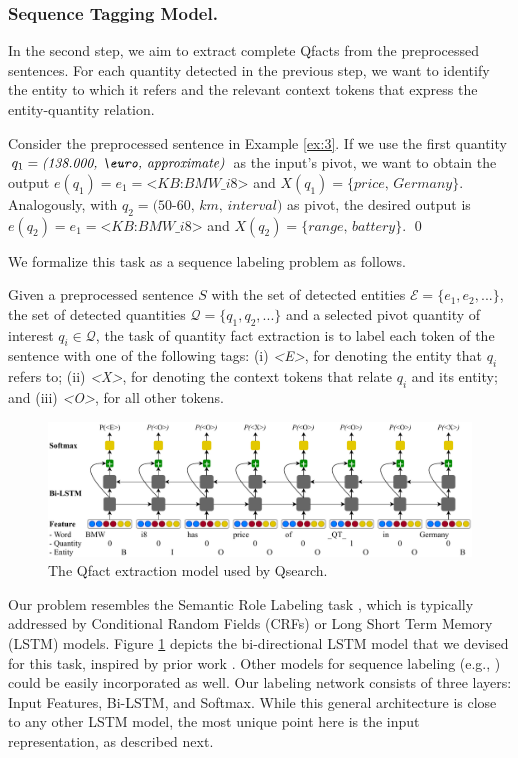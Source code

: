 \subsubsection{Sequence Tagging Model.} In the second step, we aim to extract complete Qfacts from the preprocessed sentences. 
For each quantity detected in the previous step, we want to identify the entity to which it refers
and the relevant context tokens that express the entity-quantity relation.
\begin{example} 
Consider the preprocessed sentence in Example \ref{ex:3}. If we use the first quantity $q_1 = \textit{(138.000, \euro, approximate)}$
as the input's pivot, 
we want to obtain the output $e(q_1) = e_1 = \textit{<KB:BMW\_i8>}$ and $X(q_1)=\{\textit{price, Germany}\}$. 
Analogously, with $q_2 = \textit{(50-60, km, interval)}$ as pivot,  the desired output is 
$e(q_2)= e_1 = \textit{<KB:BMW\_i8>}$ and $X(q_2)=\{\textit{range, battery}\}$. \qed
\end{example}
We formalize this task as a sequence labeling problem as follows.
\begin{task}
Given a preprocessed sentence $S$ with the set of detected entities $\mathcal{E} = \{e_1,e_2,...\}$, the set of detected quantities $\mathcal{Q} = \{q_1,q_2,...\}$ and a selected pivot quantity of interest $q_i \in \mathcal{Q}$, the task of quantity fact extraction is to label each token of the sentence with one of the following tags: (i) \textit{<E>}, for denoting the entity that $q_i$ refers to; (ii) \textit{<X>}, for denoting the context tokens that relate $q_i$ and its entity; and (iii) \textit{<O>}, for all other tokens.
\end{task}
\begin{figure}[t]
\centering
\includegraphics[width=1\textwidth]{figures/neural.pdf}
\caption{The Qfact extraction model used by Qsearch.}
\label{fig:neural}
\end{figure}
Our problem resembles the Semantic Role Labeling task \cite{DBLP:journals/coling/GildeaJ02}, which is typically addressed by
Conditional Random Fields (CRFs)
or Long Short Term Memory (LSTM) models. 
Figure \ref{fig:neural} depicts the bi-directional LSTM model 
that we devised for this task, inspired by prior work \cite{DBLP:conf/acl/HeLLZ17a}.
 Other models for sequence labeling (e.g., \cite{DBLP:conf/acl/ZhouX15, DBLP:conf/emnlp/FitzGeraldTG015})
could be easily incorporated as well. 
Our labeling network consists of three layers: Input Features, Bi-LSTM, and Softmax. 
While this general architecture is close to any other LSTM model, the most unique point here is the input representation,
as described next.

